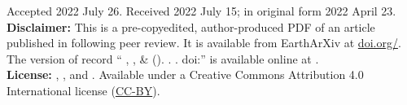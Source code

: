 \documentclass[twocolumn,10pt]{article}
\newcommand{\Author}{%
  \WesselShort{}, \WattsShort{}, \KimShort{} \& \SandwellShort{}
}
\newcommand{\AuthorLong}{%
  \Wessel{}, \Watts{}, \Kim{} and \Sandwell{}
}
\newcommand{\AuthorAffil}{%
    {\large
     \Wessel$^{1}$ \orcidlink{\WesselORCID},
     \Watts$^{2}$ \orcidlink{\WattsORCID},
     \Kim$^{3}$ \orcidlink{\KimORCID},
      and
      \Sandwell$^{3}$ \orcidlink{\SandwellORCID}
    }
    \\[0.4cm]
    {\small $^{1}$\SOEST} \\
    {\small $^{2}$\OXFORD} \\
    {\small $^{3}$\CHUNGNAM} \\
    {\small $^{4}$\UCSD} \\
    {\small\WesselMail} \\
}
\begin{document}
\title{\Title}
\author{\AuthorAffil}
\date{
    \normalsize
    \Year
}

\noindent
Accepted 2022 July 26. Received 2022 July 15; in original form 2022 April 23.
\\[0.5cm]
\noindent
\textbf{Disclaimer:}
This is a pre-copyedited, author-produced PDF of an article
published in \Journal{} following peer review.
It is available from EarthArXiv at
\href{https://doi.org/\PreprintDOI}{doi.org/\PreprintDOI}.
The version of record
``\Author{} (\Year{}). \Title{}. \Journal{}. doi:\DOI{}''
is available online at \DOILink{}.
\\[0.5cm]
\noindent
\textbf{License:}
\textcopyright{} \Year{} \AuthorLong{}.
Available under a Creative Commons Attribution 4.0 International license
(\href{https://creativecommons.org/licenses/by/4.0/}{CC-BY}).


\begin{abstract}
    
\end{abstract}











\end{document}

